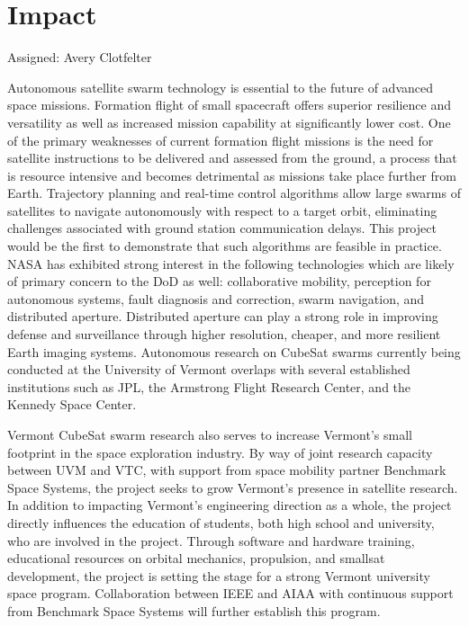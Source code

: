 \section{Impact}
Assigned: Avery Clotfelter

Autonomous satellite swarm technology is essential to the future of
advanced space missions. Formation flight of small spacecraft offers
superior resilience and versatility as well as increased mission
capability at significantly lower cost. One of the primary weaknesses
of current formation flight missions is the need for satellite
instructions to be delivered and assessed from the ground, a process
that is resource intensive and becomes detrimental as missions take
place further from Earth. Trajectory planning and real-time control
algorithms allow large swarms of satellites to navigate autonomously
with respect to a target orbit, eliminating challenges associated with
ground station communication delays. This project would be the first
to demonstrate that such algorithms are feasible in practice. NASA has
exhibited strong interest in the following technologies which are
likely of primary concern to the DoD as well: collaborative mobility,
perception for autonomous systems, fault diagnosis and correction,
swarm navigation, and distributed aperture. Distributed aperture can
play a strong role in improving defense and surveillance through
higher resolution, cheaper, and more resilient Earth imaging
systems. Autonomous research on CubeSat swarms currently being
conducted at the University of Vermont overlaps with several
established institutions such as JPL, the Armstrong Flight Research
Center, and the Kennedy Space Center. 

Vermont CubeSat swarm research also serves to increase Vermont’s small
footprint in the space exploration industry. By way of joint research
capacity between UVM and VTC, with support from space mobility partner
Benchmark Space Systems, the project seeks to grow Vermont’s presence
in satellite research. In addition to impacting Vermont’s engineering
direction as a whole, the project directly influences the education of
students, both high school and university, who are involved in the
project. Through software and hardware training, educational resources
on orbital mechanics, propulsion, and smallsat development, the
project is setting the stage for a strong Vermont university space
program. Collaboration between IEEE and AIAA with continuous support
from Benchmark Space Systems will further establish this program.

